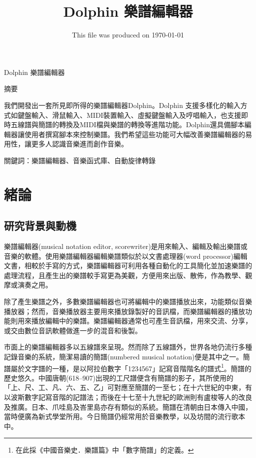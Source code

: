 \documentclass[12pt,a4paper,oneside]{report}
\begin{document}
\title{Dolphin 樂譜編輯器}
\date{This file was produced on \today}
\maketitle

\begin{center}
Dolphin 樂譜編輯器

摘要
\end{center}

我們開發出一套所見即所得的樂譜編輯器Dolphin。Dolphin 支援多樣化的輸入方式如鍵盤輸入、滑鼠輸入、MIDI裝置輸入、虛擬鍵盤輸入及哼唱輸入，也支援即時五線譜與簡譜的轉換及MIDI檔與樂譜的轉換等進階功能。Dolphin還具備腳本編輯器讓使用者撰寫腳本來控制樂譜。我們希望這些功能可大幅改善樂譜編輯器的易用性，讓更多人認識音樂進而創作音樂。

關鍵詞：樂譜編輯器、音樂函式庫、自動旋律轉錄


\tableofcontents

\chapter{緒論} %

\section{研究背景與動機} %


樂譜編輯器(musical notation editor, scorewriter)是用來輸入、編輯及輸出樂譜或音樂的軟體。使用樂譜編輯器編輯樂譜類似於以文書處理器(word processor)編輯文書，相較於手寫的方式，樂譜編輯器可利用各種自動化的工具簡化並加速樂譜的處理流程，且產生出的樂譜較手寫更為美觀，方便用來出版、散佈，作為教學、觀摩或演奏之用。

除了產生樂譜之外，多數樂譜編輯器也可將編輯中的樂譜播放出來，功能類似音樂播放器；然而，音樂播放器主要用來播放錄製好的音訊檔，而樂譜編輯器的播放功能則用來播放編輯中的樂譜。樂譜編輯器通常也可產生音訊檔，用來交流、分享，或交由數位音訊軟體做進一步的混音和後製。

市面上的樂譜編輯器多以五線譜來呈現。然而除了五線譜外，世界各地仍流行多種記錄音樂的系統，簡潔易讀的簡譜(numbered musical notation)便是其中之一。簡譜屬於文字譜的一種\cite{chinaEncyclopedia}，是以阿拉伯數字「1234567」記寫音階階名的譜式\footnote{在此採《中國音樂史．樂譜篇》中「數字簡譜」\cite{chinaMusicHistory}的定義。}。簡譜的歷史悠久。中國唐朝(618–907)出現的工尺譜便含有簡譜的影子，其所使用的「上、尺、工、凡、六、五、乙」可對應至簡譜的一至七\cite{wiki}；在十六世紀的中東，有以波斯數字記寫音階的記譜法；而後在十七至十九世紀的歐洲則有盧梭等人的改良及推廣。日本、爪哇島及峇里島亦存有類似的系統\cite{britannica}。簡譜在清朝由日本傳入中國，當時便廣為新式學堂所用。今日簡譜仍經常用於音樂教學，以及坊間的流行歌本中。
\end{document}
